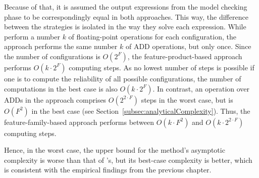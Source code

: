 Because of that, it is assumed the output expressions from the model checking phase
to be correspondingly equal in both approaches.  This way, the difference
between the strategies is isolated in the way they solve each expression. While
\citeauthor{ghezzi_model-based_2013} perform a number $k$ of floating-point
operations for each configuration, the approach performs the same number $k$ of
ADD operations, but only once.  Since the number of configurations is $O(2^F)$,
the feature-product-based approach performs $O(k \cdot 2^F)$ computing steps.
As no lowest number of steps is possible if one is to compute the reliability of
all possible configurations, the number of computations in the best case is also
$O(k \cdot 2^F)$.  In contrast, an operation over ADDs in the approach comprises
$O(2^{2 \cdot F})$ steps in the worst case, but is $O(F^2)$ in the best case
(see Section~\ref{subsec:analyticalComplexity}).  Thus, the feature-family-based
approach performs between $O(k \cdot F^2)$ and $O(k \cdot 2^{2 \cdot F})$
computing steps.

Hence, in the worst case, the upper bound for the method's
asymptotic complexity is worse than that of
\citeauthor{ghezzi_model-based_2013}'s, but its best-case complexity is better,
which is consistent with the empirical findings from the previous chapter.




